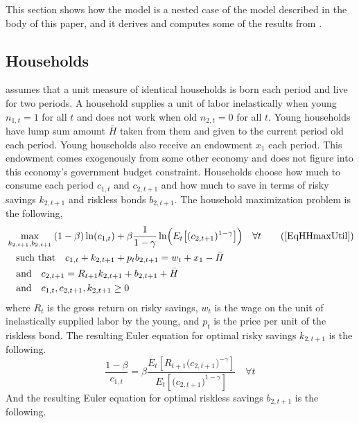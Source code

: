 \documentclass[letterpaper,12pt]{article}
\theoremstyle{definition}
\begin{document}
  This section shows how the \citet{Blanchard:2019} model is a nested case of the model described in the body of this paper, and it derives and computes some of the results from \citet{Blanchard:2019}.


  \subsection{Households}\label{SecTAppBlanchHH}

    \citet{Blanchard:2019} assumes that a unit measure of identical households is born each period and live for two periods. A household supplies a unit of labor inelastically when young $n_{1,t}=1$ for all $t$ and does not work when old $n_{2,t}=0$ for all $t$. Young households have lump sum amount $\bar{H}$ taken from them and given to the current period old each period. Young households also receive an endowment $x_1$ each period. This endowment comes exogenously from some other economy and does not figure into this economy's government budget constraint. Households choose how much to consume each period $c_{1,t}$ and $c_{2,t+1}$ and how much to save in terms of risky savings $k_{2,t+1}$ and riskless bonds $b_{2,t+1}$. The household maximization problem is the following,
    \begin{align}
      &\max_{k_{2,t+1},b_{2,t+1}}\: (1-\beta)\ln(c_{1,t}) + \beta\frac{1}{1-\gamma}\ln\Bigl(E_t\bigl[(c_{2,t+1})^{1-\gamma}\bigr]\Bigr) \quad \forall t \tag{\ref{EqHHmaxUtil}} \\
      &\quad\text{such that}\quad c_{1,t} + k_{2,t+1} + p_t b_{2,t+1} = w_t + x_1 - \bar{H} \label{EqTAppBlanch_bc1} \\
      &\quad\text{and}\quad c_{2,t+1} = R_{t+1}k_{2,t+1} + b_{2,t+1} + \bar{H} \label{EqTAppBlanch_bc2} \\
      &\quad\text{and}\quad c_{1,t},c_{2,t+1},k_{2,t+1} \geq 0 \label{EqModelRisk_nonneg}
    \end{align}
    where $R_t$ is the gross return on risky savings, $w_t$ is the wage on the unit of inelastically supplied labor by the young, and $p_t$ is the price per unit of the riskless bond. The resulting Euler equation for optimal risky savings $k_{2,t+1}$ is the following.
    \begin{equation}\label{EqTAppBlanch_Eul_c1}
      \frac{1-\beta}{c_{1,t}} = \beta \frac{E_t\left[R_{t+1}\bigl(c_{2,t+1}\bigr)^{-\gamma}\right]}{E_t\left[\bigl(c_{2,t+1}\bigr)^{1-\gamma}\right]} \quad\forall t
    \end{equation}
    And the resulting Euler equation for optimal riskless savings $b_{2,t+1}$ is the following.
\end{document}
